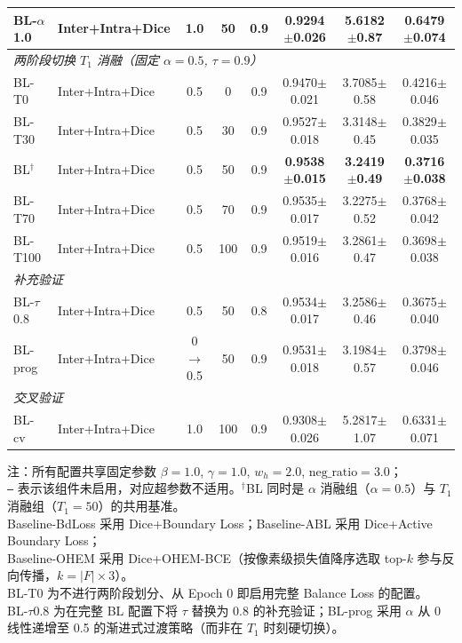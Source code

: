 \begin{table}[htbp]
\begin{tabular}{llcccccc}
    BL-$\alpha$1.0 & Inter+Intra+Dice & 1.0 & 50 & 0.9 & 0.9294$\pm$0.026 & 5.6182$\pm$0.87 & 0.6479$\pm$0.074 \\
    \hline
    \multicolumn{8}{l}{\textit{两阶段切换 $T_1$ 消融（固定 $\alpha{=}0.5$, $\tau{=}0.9$）}} \\
    BL-T0 & Inter+Intra+Dice & 0.5 & 0 & 0.9 & 0.9470$\pm$0.021 & 3.7085$\pm$0.58 & 0.4216$\pm$0.046 \\
    BL-T30 & Inter+Intra+Dice & 0.5 & 30 & 0.9 & 0.9527$\pm$0.018 & 3.3148$\pm$0.45 & 0.3829$\pm$0.035 \\
    BL$^\dagger$ & Inter+Intra+Dice & 0.5 & 50 & 0.9 & \textbf{0.9538$\pm$0.015} & \textbf{3.2419$\pm$0.49} & \textbf{0.3716$\pm$0.038} \\
    BL-T70 & Inter+Intra+Dice & 0.5 & 70 & 0.9 & 0.9535$\pm$0.017 & 3.2275$\pm$0.52 & 0.3768$\pm$0.042 \\
    BL-T100 & Inter+Intra+Dice & 0.5 & 100 & 0.9 & 0.9519$\pm$0.016 & 3.2861$\pm$0.47 & 0.3698$\pm$0.038 \\
    \hline
    \multicolumn{8}{l}{\textit{补充验证}} \\
    BL-$\tau$0.8 & Inter+Intra+Dice & 0.5 & 50 & 0.8 & 0.9534$\pm$0.017 & 3.2586$\pm$0.46 & 0.3675$\pm$0.040 \\
    BL-prog & Inter+Intra+Dice & 0$\to$0.5 & 50 & 0.9 & 0.9531$\pm$0.018 & 3.1984$\pm$0.57 & 0.3798$\pm$0.046 \\
    \hline
    \multicolumn{8}{l}{\textit{交叉验证}} \\
    BL-cv & Inter+Intra+Dice & 1.0 & 100 & 0.9 & 0.9308$\pm$0.026 & 5.2817$\pm$1.07 & 0.6331$\pm$0.071 \\
    \hline
  \end{tabular}
  \vspace{2pt}
  \parbox{\textwidth}{\scriptsize 注：所有配置共享固定参数 $\beta{=}1.0$, $\gamma{=}1.0$, $w_h{=}2.0$, $\text{neg\_ratio}{=}3.0$；\\
  \texttt{--} 表示该组件未启用，对应超参数不适用。$^\dagger$BL 同时是 $\alpha$ 消融组（$\alpha{=}0.5$）与 $T_1$ 消融组（$T_1{=}50$）的共用基准。\\
  Baseline-BdLoss 采用 Dice+Boundary Loss\cite{kervadec2019boundary}；Baseline-ABL 采用 Dice+Active Boundary Loss\cite{wang2022activeboundaryloss}；\\
  Baseline-OHEM 采用 Dice+OHEM-BCE（按像素级损失值降序选取 top-$k$ 参与反向传播，$k{=}|F|{\times}3$）。\\
  BL-T0 为不进行两阶段划分、从 Epoch 0 即启用完整 Balance Loss 的配置。\\
  BL-$\tau$0.8 为在完整 BL 配置下将 $\tau$ 替换为 0.8 的补充验证；BL-prog 采用 $\alpha$ 从 0 线性递增至 0.5 的渐进式过渡策略（而非在 $T_1$ 时刻硬切换）。}
\end{table}


